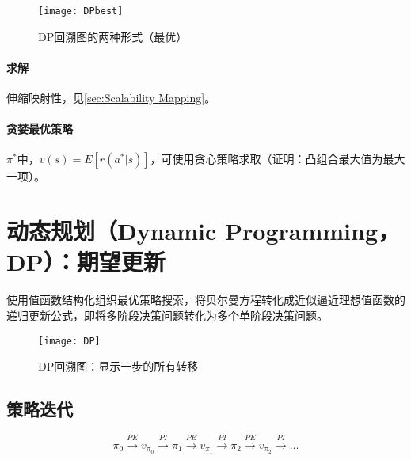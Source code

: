 \documentclass[
12pt, %
a4paper, 
oneside, %
headinclude,footinclude, %
]{scrartcl}
\begin{document}
\begin{figure}[H]
\centering 
\texttt{[image: DPbest]} 
\caption[DP回溯图的两种形式（最优）]{DP回溯图的两种形式（最优）}
\end{figure}
\paragraph{求解}\label{sec:Scalability Mapping back}
伸缩映射性，见\ref{sec:Scalability Mapping}。
\paragraph{贪婪最优策略}
$ \pi^* $中，$ v(s) = E[r(a^*|s)] $，可使用贪心策略求取（证明：凸组合最大值为最大一项）。
\section[动态规划]{动态规划（Dynamic Programming，DP）：期望更新}
\begin{minipage}{0.5\textwidth}
\hspace{2em}
使用值函数结构化组织最优策略搜索，将贝尔曼方程转化成近似逼近理想值函数的递归更新公式，即将多阶段决策问题转化为多个单阶段决策问题。
\end{minipage}
\hfill
\begin{minipage}{0.45\textwidth}
\begin{figure}[H]
\centering 
\texttt{[image: DP]} 
\caption[DP回溯图]{DP回溯图：显示一步的所有转移}
\end{figure}
\end{minipage}
\subsection[策略迭代]{策略迭代}
$$ \pi_0 \xrightarrow{PE} v_{\pi_0} \xrightarrow{PI} \pi_1 \xrightarrow{PE} v_{\pi_1} \xrightarrow{PI} \pi_2 \xrightarrow{PE} v_{\pi_2} \xrightarrow{PI} \dots $$
\end{document}
